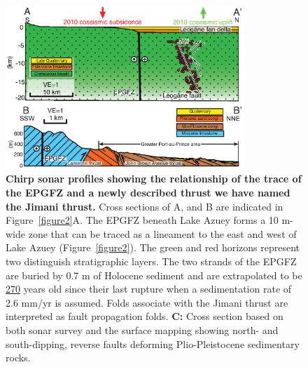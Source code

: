 \documentclass[linenumbers,draft]{agujournal}
\begin{document}
\begin{figure}
\centering
\includegraphics[width=0.8\textwidth]{Haiti_figure3}
\caption{\textbf{Chirp sonar profiles showing the relationship of the trace of the EPGFZ and a newly described thrust we have named the Jimani thrust.} Cross sections of A, and B are indicated in Figure~\ref{figure2}A. The EPGFZ beneath Lake Azuey forms a 10 m-wide zone that can be traced as a lineament to the east and west of Lake Azuey (Figure~\ref{figure2}). The green and red horizons represent two distinguish stratigraphic layers. The two strands of the EPGFZ are buried by 0.7 m of Holocene sediment and are extrapolated to be \ul{270} years old since their last rupture when a sedimentation rate of 2.6 mm/yr is assumed.  Folds associate with the Jimani thrust are interpreted as fault propagation folds. \textbf{C:} Cross section based on both sonar survey and the surface mapping \underline{\citep{mann1991overview}} showing north- and south-dipping, reverse faults deforming Plio-Pleistocene sedimentary rocks.}
\label{figure6}
\end{figure}
\end{document}
